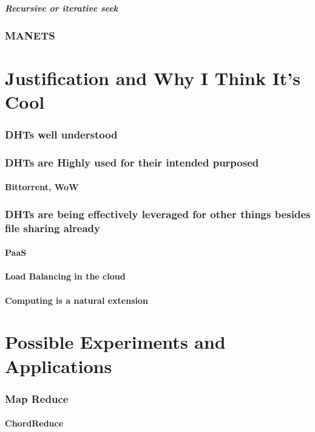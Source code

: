 \documentclass[10pt,letterpaper]{report}
\begin{document}
\paragraph{Recursive or iterative seek}


\subsection{MANETS}
\chapter{Justification and Why I Think It's Cool}
\subsection{DHTs well understood}
\subsection{DHTs are Highly used for their intended purposed}
\subsubsection{Bittorrent, WoW}
\subsection{DHTs are being effectively leveraged for other things besides file sharing already}
\subsubsection{PaaS}
\subsubsection{Load Balancing in the cloud}
\subsubsection{Computing is a natural extension}

\chapter{Possible Experiments and Applications}

\subsection{Map Reduce}
\subsubsection{ChordReduce}
\end{document}
